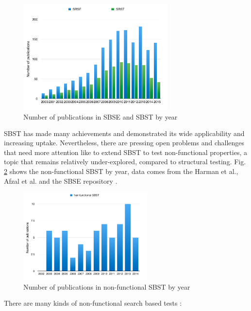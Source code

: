 \documentclass[espaco=umemeio,chapter=TITLE,twoside,openright]{abnt}
\begin{document}
\begin{figure}[h]
\centering
\includegraphics[width=0.7\textwidth]{./images/publications1.png}
\caption{Number of publications in SBSE and SBST by year \cite{Afzal2009a} \cite{Harman2015}}
\label{fig:sbsesbst}
\end{figure}

SBST has made many achievements and demonstrated its wide applicability and increasing uptake. Nevertheless, there are pressing open problems and challenges that need more attention like to extend SBST to test non-functional properties, a topic that remains relatively under-explored, compared to structural testing.  Fig. \ref{fig:nonfunctional} shows the non-functional SBST by year, data comes from the Harman et al., Afzal et al. and the SBSE repository \cite{Aleti2016} \cite{Harman2015}.


\begin{figure}[h]
\centering
\includegraphics[width=0.6\textwidth]{./images/nonfunctional.png}
\caption{Number of publications in non-functional SBST by year \cite{Afzal2009a} \cite{Harman2015} }
\label{fig:nonfunctional}
\end{figure}



There are many kinds of non-functional search based tests  \cite{Afzal2009a}:
\end{document}
